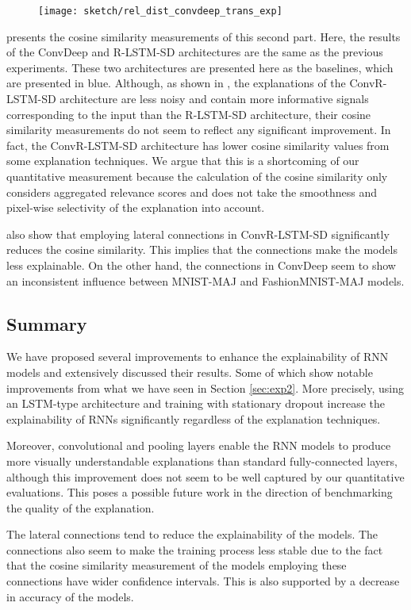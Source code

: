  \begin{figure}[!htb]
\centering
\texttt{[image: sketch/rel\_dist\_convdeep\_trans\_exp]}
\label{fig:rel_dist_convdeep_trans_exp}
\end{figure}

\addfigure{\ref{fig:rel_dist_convdeep_trans_exp}} presents the cosine similarity measurements of this second part. Here, the results of the ConvDeep and R-LSTM-SD architectures are the same as the previous experiments. These two architectures are presented here as the baselines, which are presented in blue.  Although,  as shown in \addfigure{\ref{fig:heatmap_msc_convrlstm_pos_rel}}, the explanations of the ConvR-LSTM-SD architecture are less noisy and contain more informative signals corresponding to the input than the R-LSTM-SD architecture, their cosine similarity measurements do not seem to reflect any significant improvement. In fact,  the ConvR-LSTM-SD architecture has lower cosine similarity values from some explanation techniques. We argue that this is a shortcoming of our quantitative measurement because the calculation of the cosine similarity only considers aggregated relevance scores and does not take the smoothness and pixel-wise selectivity of the explanation into account. 

\addfigure{\ref{fig:rel_dist_convdeep_trans_exp}} also show that employing lateral connections in ConvR-LSTM-SD significantly reduces the cosine similarity. This implies that the connections make the models less explainable. On the other hand, the connections in ConvDeep  seem to show an inconsistent influence between MNIST-MAJ and FashionMNIST-MAJ models. 


\subsection{Summary}
We have proposed several improvements to enhance the explainability of RNN models and extensively discussed their results.  Some of which show notable improvements from what we have seen in Section \ref{sec:exp2}. More precisely, using an LSTM-type architecture and training with stationary dropout increase the explainability of RNNs significantly regardless of the explanation techniques.

Moreover, convolutional and pooling layers enable the RNN models to produce more visually understandable explanations than standard fully-connected layers, although this improvement does not seem to be well  captured by our quantitative evaluations. This poses a possible future work in the direction of benchmarking the quality of the explanation.

The lateral connections tend to reduce the explainability of the models.  The connections also seem to make the training process less stable due to the fact that the cosine similarity measurement of the models employing these connections have wider confidence intervals. This is also supported by a decrease in accuracy of the models. 